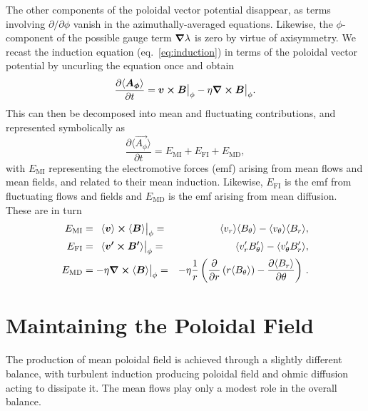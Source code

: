The other components of the poloidal vector potential disappear, as terms involving
$\partial/\partial \phi$ vanish in the azimuthally-averaged equations.  
Likewise, the $\phi$-component of the possible gauge term $\boldsymbol{\nabla} \lambda$ is zero by
virtue of axisymmetry.
We recast the induction equation (eq.~\ref{eq:induction}) in terms of
the poloidal vector potential by uncurling the equation once and obtain
\begin{equation}
  \label{eq:A induction}
    \frac{\partial\langle\boldsymbol{A_\phi}\rangle}{\partial t} = 
        \boldsymbol{v} \boldsymbol{\times} \boldsymbol{B}{\big|}_\phi - \eta \boldsymbol{\nabla} \boldsymbol{\times}
        \boldsymbol{B}{\big|}_\phi.
\end{equation}
This can then be decomposed into mean and fluctuating contributions,
and represented symbolically as 
\begin{equation}
  \label{eq:A induction symbolic}
    \frac{\partial\langle\vec{A_\phi}\rangle}{\partial t} = 
        E_\mathrm{MI} + E_\mathrm{FI} + E_\mathrm{MD},
\end{equation}
with $E_\mathrm{MI}$ representing the electromotive forces (emf)
arising from mean flows and mean fields, and related to their mean
induction.  Likewise, $E_\mathrm{FI}$ is
the emf from fluctuating flows and fields and $E_\mathrm{MD}$ is 
the emf arising from mean diffusion.  These are in turn
\begin{eqnarray}
  \label{eq:A MI phi}
  E_\mathrm{MI} &= \phn\langle \vec{v} \rangle \cross \langle \vec{B} \rangle{\big|}_\phi
                 =& \langle v_r \rangle \langle B_\theta \rangle - 
                    \langle v_\theta \rangle \langle B_r \rangle, \\
  \label{eq:A FI phi}
  E_\mathrm{FI} &= \phn\langle \vec{v'}\cross\vec{B'} \rangle{\big|}_\phi
                 =& \langle v_r' B_\theta' \rangle - 
                    \langle v_\theta' B_r' \rangle, \\
  \label{eq:A MD phi}
  E_\mathrm{MD} &= -\eta \vec{\del} \cross \langle \vec{B} \rangle{\big|}_\phi 
                 =& -\eta \frac{1}{r} \left(\frac{\partial}{\partial r} 
		    \left(r \langle B_\theta \rangle \right)
		    - \frac{\partial \langle B_r \rangle}{\partial \theta}\right)\thinspace. 
\end{eqnarray}



\section{Maintaining the Poloidal Field}
The production of mean poloidal field is achieved through a slightly
different balance, with turbulent induction producing poloidal field and
ohmic diffusion acting to dissipate it.  The mean flows play
only a modest role in the overall balance.  

